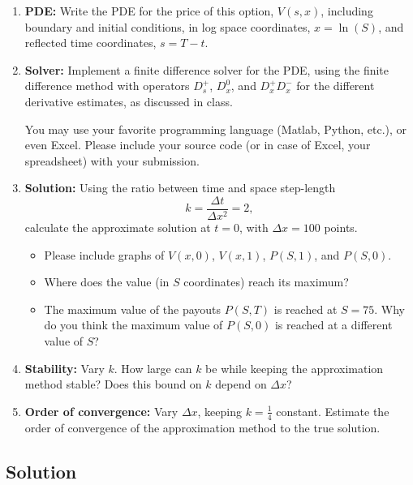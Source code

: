 \documentclass{article}
\begin{document}
\begin{enumerate}
\item[(a)] \textbf{PDE:} Write the PDE for the price of this option, $V(s,x)$, including boundary and initial conditions, in log space coordinates, $x=\ln(S)$, and reflected time coordinates, $s=T-t$.

\item[(b)] \textbf{Solver:} Implement a finite difference solver for the PDE, using the finite difference method with operators $D_s^+$, $D_x^0$, and $D_x^+D_x^-$ for the different derivative estimates, as discussed in class.

You may use your favorite programming language (Matlab, Python, etc.), or even Excel. Please include your source code (or in case of Excel, your spreadsheet) with your submission.

\item[(c)] \textbf{Solution:} Using the ratio between time and space step-length
\[
k=\frac{\Delta t}{\Delta x^2}=2,
\]
calculate the approximate solution at $t=0$, with $\Delta x = 100$ points.
\begin{itemize}
\item Please include graphs of $V(x,0)$, $V(x,1)$, $P(S,1)$, and $P(S,0)$.
\item Where does the value (in $S$ coordinates) reach its maximum?
\item The maximum value of the payouts $P(S,T)$ is reached at $S=75$. Why do you think the maximum value of $P(S,0)$ is reached at a different value of $S$?
\end{itemize}

\item[(d)] \textbf{Stability:} Vary $k$. How large can $k$ be while keeping the approximation method stable? Does this bound on $k$ depend on $\Delta x$?

\item[(e)] \textbf{Order of convergence:} Vary $\Delta x$, keeping $k=\frac{1}{4}$ constant. Estimate the order of convergence of the approximation method to the true solution.
\end{enumerate}


\subsection*{Solution}
\end{document}
